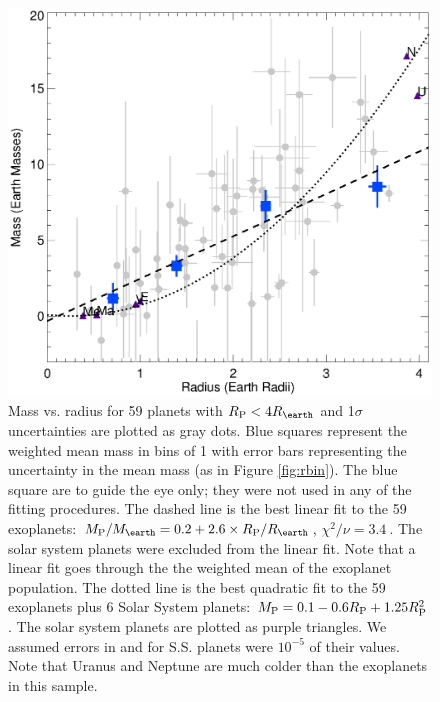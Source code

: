 \documentclass[11pt]{aastex}
\newcommand{\chisquared}{3.4~}
\begin{document}
\begin{figure}[htbp] %
   \centering
    \includegraphics[width=6in]{rm_small4.eps} 
   \caption{\small Mass vs. radius for 59 planets with $\rpl < 4 \rearth$ and 1$\sigma$ uncertainties are plotted as gray dots.  Blue squares represent the weighted mean mass in bins of 1 \rearth with error bars representing the uncertainty in the mean mass (as in Figure \ref{fig:rbin}).  The blue square are to guide the eye only; they were not used in any of the fitting procedures.  The dashed line is the best linear fit to the 59 exoplanets: $\mpl/\mearth = 0.2 + 2.6 \times \rpl/\rearth$, $\chi^2/\nu = \chisquared$.  The solar system planets were excluded from the linear fit.  Note that a linear fit goes through the the weighted mean of the exoplanet population.  The dotted line is the best quadratic fit to the 59 exoplanets plus 6 Solar System planets: $M_{\rm P} = 0.1 - 0.6 R_{\rm P} + 1.25 R_{\rm P}^2$.  The solar system planets are plotted as purple triangles.  We assumed errors in \mpl and \rpl for S.S. planets were $10^{-5}$ of their values.   Note that Uranus and Neptune are much colder than the exoplanets in this sample.}
   \label{fig:rm_4}
\end{figure}
\end{document}
